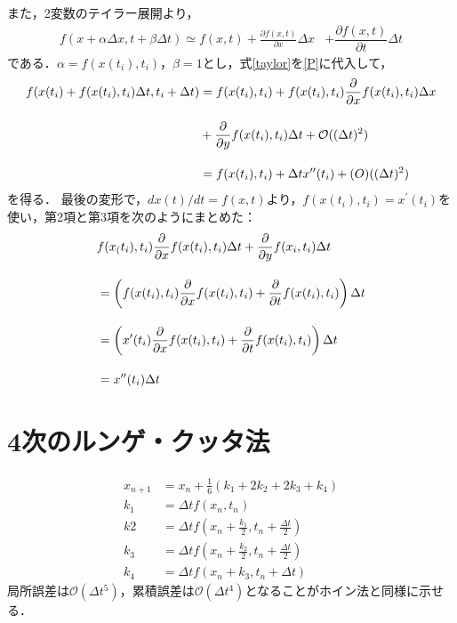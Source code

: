 また，2変数のテイラー展開より，
\begin{align}\label{taylor}
f(x+\alpha\Delta x,t+\beta\Delta t)
%
\simeq f(x,t)+\frac{\partial f(x,t)}{\partial x}\Delta x&+\dfrac{\partial f(x,t)}{\partial t}\Delta t
\end{align}
である．$\alpha=f(x(t_i),t_i)$，$\beta=1$とし，式\eqref{taylor}を\eqref{P}に代入して，
\begin{align}
	f(x(t_i)+f(x(t_i),t_i)\Delta t, t_i+\Delta t)
	&=f(x(t_i),t_i)+f(x(t_i),t_i)\frac{\partial }{\partial x}f(x(t_i),t_i)\Delta x\nn[10pt]
	&+\dfrac{\partial}{\partial y} f(x(t_i),t_i)\Delta t
	+\mathcal{O}((\Delta t)^2)\nn[10pt]
	&=f(x(t_i),t_i)+\Delta tx^{\prime\prime}(t_i) + \mathcal(O)((\Delta t)^2)
\end{align}
を得る．
最後の変形で，$dx(t)/dt=f(x,t)$より，$f(x(t_i),t_i)=x^{\prime}(t_i)$を使い，第2項と第3項を次のようにまとめた：
\begin{align}
	&f(x_(t_i),t_i)\frac{\partial }{\partial x}f(x(t_i),t_i)\Delta t
	+\dfrac{\partial}{\partial y} f(x_i,t_i)\Delta t\nn[10pt]
	&=\left(f(x(t_i),t_i)\frac{\partial }{\partial x}f(x(t_i),t_i)
	+\dfrac{\partial}{\partial t} f(x(t_i),t_i)
	\right)\Delta t\nn[10pt]
	&=
	\left(x^{\prime}(t_i)\frac{\partial }{\partial x}f(x(t_i),t_i)
	+\dfrac{\partial}{\partial t} f(x(t_i),t_i)
	\right)\Delta t\nn[10pt]
	&=x^{\prime\prime}(t_i)\Delta t
\end{align}

\section{4次のルンゲ・クッタ法}
\begin{align}
	x_{n+1}&=x_n+\frac{1}{6}(k_1+2k_2+2k_3+k_4)\\[10pt]
	k_1&=\Delta t f(x_n,t_n)\\[10pt]
	k2 &=\Delta t f\left(x_n+\frac{k_1}{2},t_n+\frac{\Delta t}{2}\right)\\[10pt]
	k_3 &=\Delta t f\left(x_n+\frac{k_2}{2},t_n+\frac{\Delta t}{2}\right)\\[10pt]
	k_4&=\Delta tf(x_n+k_3,t_n+\Delta t)
\end{align}
局所誤差は$\mathcal O(\Delta t^5)$，累積誤差は$\mathcal O(\Delta t^4)$となることがホイン法と同様に示せる．
